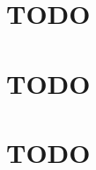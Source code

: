 \documentclass[11pt]{article}
\begin{document}
\section{{\bfseries\sffamily TODO} \cite{yeo2016role}}
\label{sec:orgeaa77a3}
\section{{\bfseries\sffamily TODO} \cite{zhang2019review}}
\label{sec:org471ee8c}
\section{{\bfseries\sffamily TODO} \cite{zheng2016intermodel}}
\label{sec:org1371712}
\section{\cite{zheng2017response}}
\label{sec:org013bb4e}



\end{document}
